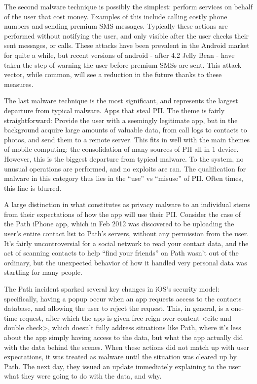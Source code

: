 The second malware technique is possibly the simplest: perform services on behalf of the user that cost money. Examples of this include calling costly phone numbers and sending premium SMS messages. Typically these actions are performed without notifying the user, and only visible after the user checks their sent messages, or calls. These attacks have been prevalent in the Android market for quite a while, but recent versions of android - after 4.2 Jelly Bean - have taken the step of warning the user before premium SMSs are sent. This attack vector, while common, will see a reduction in the future thanks to these measures.

The last malware technique is the most significant, and represents the largest departure from typical malware. Apps that steal PII. The theme is fairly straightforward: Provide the user with a seemingly legitimate app, but in the background acquire large amounts of valuable data, from call logs to contacts to photos, and send them to a remote server. This fits in well with the main themes of mobile computing: the consolidation of many sources of PII all in 1 device. However, this is the biggest departure from typical malware. To the system, no unusual operations are performed, and no exploits are ran. The qualification for malware in this category thus lies in the ``use'' vs ``misuse'' of PII. Often times, this line is blurred.

A large distinction in what constitutes as privacy malware to an individual stems from their expectations of how the app will use their PII. Consider the case of the Path iPhone app, which in Feb 2012 was discovered to be uploading the user’s entire contact list to Path’s servers, without any permission from the user. It’s fairly uncontroversial for a social network to read your contact data, and the act of scanning contacts to help ``find your friends'' on Path wasn’t out of the ordinary, but the unexpected behavior of how it handled very personal data was startling for many people.

The Path incident sparked several key changes in iOS’s security model: specifically, having a popup occur when an app requests access to the contacts database, and allowing the user to reject the request. This, in general, is a one-time request, after which the app is given free reign over content <cite and double check>, which doesn’t fully address situations like Path, where it’s less about the app simply having access to the data, but what the app actually did with the data behind the scenes. When these actions did not match up with user expectations, it was treated as malware until the situation was cleared up by Path. The next day, they issued an update immediately explaining to the user what they were going to do with the data, and why.

